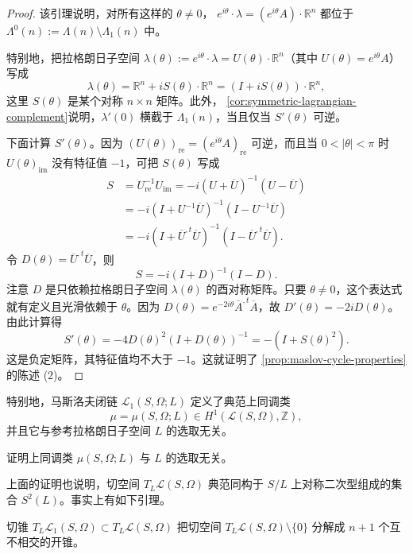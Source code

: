 \begin{proof}
该引理说明，对所有这样的 $\theta\ne0$，
$e^{i\theta}\cdot\lambda=(e^{i\theta}A)\cdot\mathbb R^n$ 都位于
$\Lambda^0(n):=\Lambda(n)\setminus\Lambda_1(n)$ 中。

特别地，把拉格朗日子空间
$\lambda(\theta):=e^{i\theta}\cdot\lambda=U(\theta)\cdot\mathbb R^n$（其中
$U(\theta)=e^{i\theta}A$）写成
\[
 \lambda(\theta)=\mathbb R^n+iS(\theta)\cdot\mathbb R^n
 =(I+iS(\theta))\cdot\mathbb R^n,
\]
这里 $S(\theta)$ 是某个对称 $n\times n$ 矩阵。此外，
\cref{cor:symmetric-lagrangian-complement}说明，$\lambda'(0)$ 横截于
$\Lambda_1(n)$，当且仅当 $S'(\theta)$ 可逆。

下面计算 $S'(\theta)$。因为
$(U(\theta))_{\mathrm{re}}=(e^{i\theta}A)_{\mathrm{re}}$ 可逆，而且当
$0<|\theta|<\pi$ 时 $U(\theta)_{\mathrm{im}}$ 没有特征值 $-1$，可把 $S(\theta)$ 写成
\[
\begin{aligned}
 S
 &=U_{\mathrm{re}}^{-1}U_{\mathrm{im}}
 =-i(U+\overline U)^{-1}(U-\overline U)\\
 &=-i(I+U^{-1}\overline U)^{-1}(I-U^{-1}\overline U)\\
 &=-i(I+\overline U^{,t}\overline U)^{-1}
          (I-\overline U^{,t}\overline U).
\end{aligned}
\]
令 $D(\theta)=\overline U^{,t}\overline U$，则
\[
 S=-i(I+D)^{-1}(I-D).
\]
注意 $D$ 是只依赖拉格朗日子空间 $\lambda(\theta)$ 的酉对称矩阵。只要
$\theta\ne0$，这个表达式就有定义且光滑依赖于 $\theta$。因为
$D(\theta)=e^{-2i\theta}\overline A^{,t}\overline A$，故
$D'(\theta)=-2iD(\theta)$。由此计算得
\[
 S'(\theta)=-4D(\theta)^2(I+D(\theta))^{-1}
 =-(I+S(\theta)^2).
\]
这是负定矩阵，其特征值均不大于 $-1$。这就证明了
\cref{prop:maslov-cycle-properties}的陈述 (2)。
\end{proof}

特别地，马斯洛夫闭链 $\mathcal L_1(S,\Omega;L)$ 定义了典范上同调类
\[
 \mu=\mu(S,\Omega;L)\in H^1(\mathcal L(S,\Omega),\mathbb Z),
\]
并且它与参考拉格朗日子空间 $L$ 的选取无关。

\begin{exercise}\label{ex:maslov-class-reference-independent}
证明上同调类 $\mu(S,\Omega;L)$ 与 $L$ 的选取无关。
\end{exercise}

上面的证明也说明，切空间 $T_L\mathcal L(S,\Omega)$ 典范同构于
$S/L$ 上对称二次型组成的集合 $S^2(L)$。事实上有如下引理。

\begin{lemma}\label{lem:maslov-tangent-cones}
切锥 $T_L\mathcal L_1(S,\Omega)\subset T_L\mathcal L(S,\Omega)$ 把切空间
$T_L\mathcal L(S,\Omega)\setminus\{0\}$ 分解成 $n+1$ 个互不相交的开锥。
\end{lemma}

